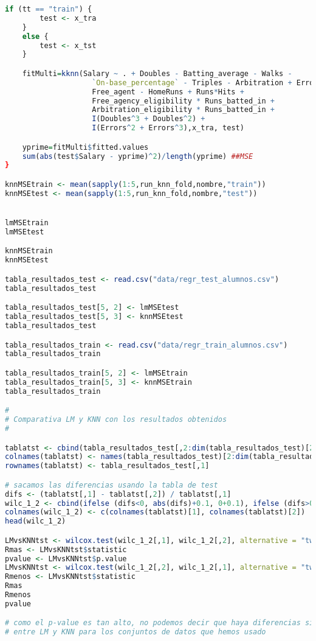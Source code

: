 \begin{lstlisting}[language=R]
	if (tt == "train") {
		test <- x_tra
	}
	else {
		test <- x_tst
	}

	fitMulti=kknn(Salary ~ . + Doubles - Batting_average - Walks -
					`On-base_percentage` - Triples - Arbitration + Errors -
					Free_agent - HomeRuns + Runs*Hits +
					Free_agency_eligibility * Runs_batted_in +
					Arbitration_eligibility * Runs_batted_in +
					I(Doubles^3 + Doubles^2) +
					I(Errors^2 + Errors^3),x_tra, test)

	yprime=fitMulti$fitted.values
	sum(abs(test$Salary - yprime)^2)/length(yprime) ##MSE
}

knnMSEtrain <- mean(sapply(1:5,run_knn_fold,nombre,"train"))
knnMSEtest <- mean(sapply(1:5,run_knn_fold,nombre,"test"))


lmMSEtrain
lmMSEtest

knnMSEtrain
knnMSEtest

tabla_resultados_test <- read.csv("data/regr_test_alumnos.csv")
tabla_resultados_test

tabla_resultados_test[5, 2] <- lmMSEtest
tabla_resultados_test[5, 3] <- knnMSEtest
tabla_resultados_test

tabla_resultados_train <- read.csv("data/regr_train_alumnos.csv")
tabla_resultados_train

tabla_resultados_train[5, 2] <- lmMSEtrain
tabla_resultados_train[5, 3] <- knnMSEtrain
tabla_resultados_train

#
# Comparativa LM y KNN con los resultados obtenidos
#

tablatst <- cbind(tabla_resultados_test[,2:dim(tabla_resultados_test)[2]])
colnames(tablatst) <- names(tabla_resultados_test)[2:dim(tabla_resultados_test)[2]]
rownames(tablatst) <- tabla_resultados_test[,1]

# sacamos las diferencias usando la tabla de test
difs <- (tablatst[,1] - tablatst[,2]) / tablatst[,1]
wilc_1_2 <- cbind(ifelse (difs<0, abs(difs)+0.1, 0+0.1), ifelse (difs>0, abs(difs)+0.1, 0+0.1))
colnames(wilc_1_2) <- c(colnames(tablatst)[1], colnames(tablatst)[2])
head(wilc_1_2)

LMvsKNNtst <- wilcox.test(wilc_1_2[,1], wilc_1_2[,2], alternative = "two.sided", paired=TRUE)
Rmas <- LMvsKNNtst$statistic
pvalue <- LMvsKNNtst$p.value
LMvsKNNtst <- wilcox.test(wilc_1_2[,2], wilc_1_2[,1], alternative = "two.sided", paired=TRUE)
Rmenos <- LMvsKNNtst$statistic
Rmas
Rmenos
pvalue

# como el p-value es tan alto, no podemos decir que haya diferencias significativas
# entre LM y KNN para los conjuntos de datos que hemos usado



\end{lstlisting}
